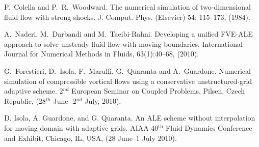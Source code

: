 
\begin{thebibliography}{10}
{\sc P.~Colella and P.~R.~Woodward}. {The numerical simulation of two-dimensional fluid flow with strong shocks}. J. Comput. Phys. (Elsevier) 54: 115--173, (1984).
	
{\sc A.~Naderi, M.~Darbandi and M.~Taeibi-Rahni}. {Developing a unified FVE-ALE approach to solve unsteady fluid flow with moving boundaries}. {International Journal for Numerical Methods in Fluids, 63(1):40--68, (2010).}
	
{\sc G.~Forestieri, D.~Isola, F.~Marulli, G.~Quaranta and A.~Guardone}. {Numerical simulation of compressible vortical flows using a conservative unstructured-grid adaptive scheme}. 2$^{nd}$ European Seminar on Coupled Problems, Pilsen, Czech Republic, (28$^{th}$ June -2$^{nd}$ July, 2010).
	
{\sc D. Isola, A. Guardone, and G. Quaranta}. {An {ALE} scheme without interpolation for moving domain with adaptive grids}. AIAA 40\ensuremath{^{\textrm{th}}} Fluid Dynamics Conference and Exhibit, Chicago, IL, USA, (28 June--1 July 2010).
\end{thebibliography}